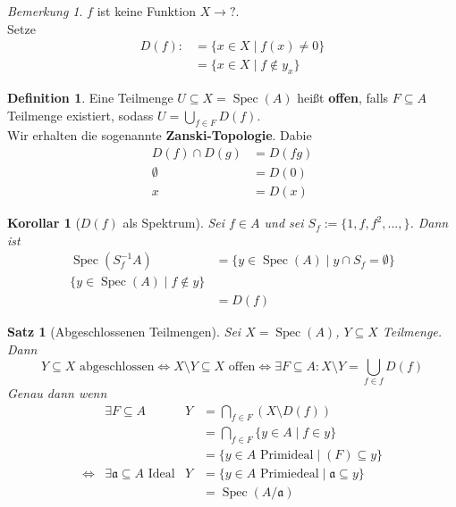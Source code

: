 \documentclass[10pt,a4paper]{article}
\newcommand{\Spec}{\ensuremath{\operatorname{Spec}}}
\newcounter{thm}[section]
\theoremstyle{definition}
\newtheorem{definition}[thm]{Definition}
\theoremstyle{plain}
\newtheorem{kor}[thm]{Korollar}
\newtheorem{satz}[thm]{Satz}
\theoremstyle{remark}
\newtheorem{bem}[thm]{Bemerkung}
\begin{document}
\begin{bem}
	$f$ ist keine Funktion $X\rightarrow ?$.\\
	Setze
	\begin{align*}
	D(f):&=\{x\in X\mid f(x)\neq 0\}\\
	&=\{x\in X\mid f\notin y_x\}
	\end{align*}
\end{bem}

\begin{definition}
	Eine Teilmenge $U\subseteq X=\Spec(A)$ heißt \textbf{offen}, falls $F\subseteq A$ Teilmenge existiert, sodass $U=\bigcup_{f\in F}D(f)$.\\
	Wir erhalten die sogenannte \textbf{Zanski-Topologie}.
	Dabie
	\begin{align*}
	D(f)\cap D(g)&=D(fg)\\
	\emptyset&=D(0)\\
	x&=D(x)
	\end{align*} 
\end{definition}

\setcounter{thm}{17}
\begin{kor}[$D(f)$ als Spektrum]
	Sei $f\in A$ und sei $S_f:=\{1,f,f^2,...,\}$. Dann ist\begin{align*}
	\Spec(S^{-1}_fA)&=\{y\in\Spec(A)\mid y\cap S_f=\emptyset\}\\
	\{y\in\Spec(A)\mid f\notin y\}\\
	&=D(f)
	\end{align*}
\end{kor}

\begin{satz}[Abgeschlossenen Teilmengen]
	Sei $X=\Spec(A)$, $Y\subseteq X$ Teilmenge. Dann
	\[\text{$Y\subseteq X$ abgeschlossen}
	\Leftrightarrow \text{$X\setminus Y\subseteq X$ offen}
	\Leftrightarrow \exists F\subseteq A:X\setminus Y=\bigcup_{f\in f}D(f)\]
	Genau dann wenn
	\begin{align*}
	&\exists F\subseteq A&Y&=\bigcap_{f\in F}(X\setminus D(f))\\
	&&&=\bigcap_{f\in F}\{y\in A\mid f\in y\}\\
	&&&=\{y\in A\text{ Primideal}\mid(F)\subseteq y\}\\
	\Leftrightarrow&\exists\mathfrak a\subseteq A\text{ Ideal}&Y&=\{y\in A\text{ Primiedeal}\mid\mathfrak a\subseteq y\}\\
	&&&=\Spec(A/\mathfrak a)
	\end{align*}
\end{satz}
\end{document}
